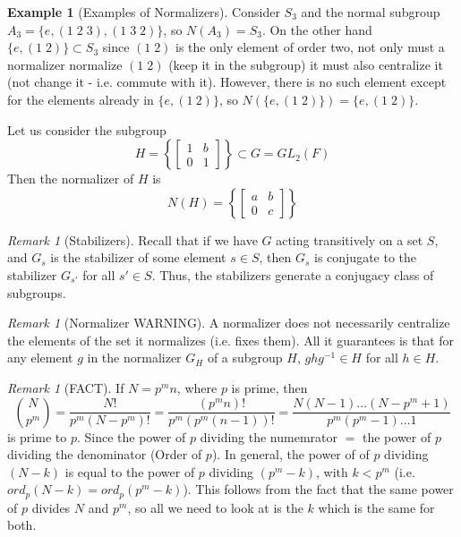 \documentclass[12pt]{article}
\theoremstyle{definition}
\newtheorem{eg}[thm]{Example}
\theoremstyle{remark}
\newtheorem{rmk}[thm]{Remark}
\numberwithin{equation}{section}
\begin{document}
\begin{eg}[Examples of Normalizers]
        Consider $S_3$ and the normal subgroup $A_3 = \{e, (1\;2\;3),(1\;3\;2)\}$, so $N(A_3) = S_3$. On the other hand $\{e,(1\;2)\} \subset S_3$ since $(1\;2)$ is the only element of order two, not only must a normalizer normalize $(1\;2)$ (keep it in the subgroup) it must also centralize it (not change it - i.e. commute with it). However, there is no such element except for the elements already in $\{e,(1\:2)\}$, so $N(\{e,(1\;2)\}) = \{e,(1\;2)\}$.


        Let us consider the subgroup \begin{equation}
                H = \left\{\begin{bmatrix} 1 & b \\ 0 & 1 \end{bmatrix}\right\} \subset G = GL_2(F)
        \end{equation}
        Then the normalizer of $H$ is \begin{equation}
                N(H) = \left\{\begin{bmatrix} a & b \\ 0 & c \end{bmatrix}\right\} 
        \end{equation}
\end{eg}

\vspace{15pt}

\begin{rmk}[Stabilizers]
        Recall that if we have $G$ acting transitively on a set $S$, and $G_s$ is the stabilizer of some element $s \in S$, then $G_s$ is conjugate to the stabilizer $G_{s'}$ for all $s' \in S$. Thus, the stabilizers generate a conjugacy class of subgroups.
\end{rmk}

\vspace{15pt}

\begin{rmk}[Normalizer WARNING]
        A normalizer does not necessarily centralize the elements of the set it normalizes (i.e. fixes them). All it guarantees is that for any element $g$ in the normalizer $G_H$ of a subgroup $H$, $ghg^{-1} \in H$ for all $h \in H$.
\end{rmk}

\vspace{15pt}

\begin{rmk}[FACT]
        If $N = p^mn$, where $p$ is prime, then \begin{equation}
                \binom{N}{p^m} = \frac{N!}{p^m(N-p^m)!} = \frac{(p^mn)!}{p^m(p^m(n-1))!} = \frac{N(N-1)...(N-p^m+1)}{p^m(p^m-1)...1}
        \end{equation}
        is prime to $p$. Since the power of $p$ dividing the numemrator $=$ the power of $p$ dividing the denominator (Order of $p$). In general, the power of of $p$ dividing $(N-k)$ is equal to the power of $p$ dividing $(p^m-k)$, with $k < p^m$ (i.e. $ord_p(N-k) = ord_p(p^m - k)$). This follows from the fact that the same power of $p$ divides $N$ and $p^m$, so all we need to look at is the $k$ which is the same for both.
\end{rmk}
\end{document}
